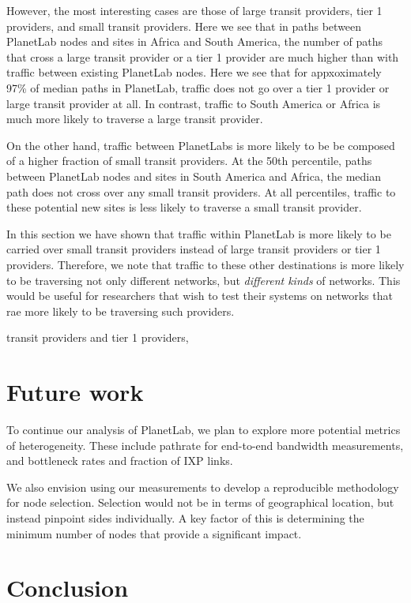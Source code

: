 \documentclass{sig-alternate-10pt}
\begin{document}
However, the most interesting cases are those of large transit providers, tier
1 providers, and small transit providers. Here we see that in paths between
PlanetLab nodes and sites in Africa and South America, the number of paths that
cross a large transit provider or a tier 1 provider are much higher than with
traffic between existing PlanetLab nodes. Here we see that for appxoximately
97\% of median paths in PlanetLab, traffic does not go over a tier 1 provider
or large transit provider at all. In contrast, traffic to South America or
Africa is much more likely to traverse a large transit provider. 

On the other hand, traffic between PlanetLabs is more likely to be be composed
of a higher fraction of small transit providers. At the 50th percentile, paths
between PlanetLab nodes and sites in South America and Africa, the median path
does not cross over any small transit providers. At all percentiles, traffic to
these potential new sites is less likely to traverse a small transit provider.

In this section we have shown that traffic within PlanetLab is more likely to
be carried over small transit providers instead of large transit providers or
tier 1 providers. Therefore, we note that traffic to these other destinations
is more likely to be traversing not only different networks, but
\emph{different kinds} of networks. This would be useful for researchers that
wish to test their systems on networks that rae more likely to be traversing
such providers. 


transit providers and tier 1 providers, 


\section{Future work}

To continue our analysis of PlanetLab, we plan to explore more potential metrics
of heterogeneity. These include pathrate for end-to-end bandwidth measurements,
and bottleneck rates and fraction of IXP links. 

We also envision using our measurements to develop a reproducible methodology for
node selection. Selection would not be in terms of geographical location, but 
instead pinpoint sides individually. A key factor of this is determining the 
minimum number of nodes that  provide a significant impact.

\section{Conclusion}




\end{document}
